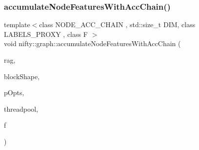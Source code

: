 \subsubsection{\texorpdfstring{accumulate\+Node\+Features\+With\+Acc\+Chain()}{accumulateNodeFeaturesWithAccChain()}\hspace{0.1cm}{\footnotesize\ttfamily [2/2]}}
{\footnotesize\ttfamily template$<$class N\+O\+D\+E\+\_\+\+A\+C\+C\+\_\+\+C\+H\+A\+IN , std\+::size\+\_\+t D\+IM, class L\+A\+B\+E\+L\+S\+\_\+\+P\+R\+O\+XY , class F $>$ \\
void nifty\+::graph\+::accumulate\+Node\+Features\+With\+Acc\+Chain (\begin{DoxyParamCaption}\item[{const \hyperlink{classnifty_1_1graph_1_1GridRag}{Grid\+Rag}$<$ D\+IM, L\+A\+B\+E\+L\+S\+\_\+\+P\+R\+O\+XY $>$ \&}]{rag,  }\item[{const \hyperlink{namespacenifty_1_1array_a683f151f19c851754e0c6d55ed16a0c2}{array\+::\+Static\+Array}$<$ int64\+\_\+t, D\+IM $>$ \&}]{block\+Shape,  }\item[{const \hyperlink{classnifty_1_1parallel_1_1ParallelOptions}{parallel\+::\+Parallel\+Options} \&}]{p\+Opts,  }\item[{\hyperlink{classnifty_1_1parallel_1_1ThreadPool}{parallel\+::\+Thread\+Pool} \&}]{threadpool,  }\item[{F \&\&}]{f }\end{DoxyParamCaption})}

\mbox{\label{namespacenifty_1_1graph_ad7d29a3cfced104a7af73df235b91238}} 
